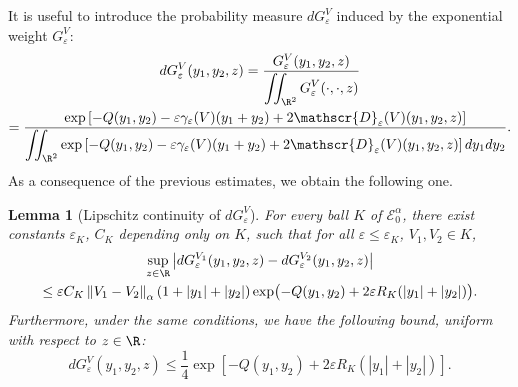 \documentclass[10pt]{amsart}
\let\mathcal\mathscr
\theoremstyle{plain}
\newtheorem{lem}[thm]{Lemma}
\theoremstyle{definition}
\newcommand{\D}{\mathcal{D}_\eps}
\let\eps\varepsilon
\let\ds\displaystyle
\newcommand{\abs}[1]{\left\lvert#1\right\rvert}
\newcommand{\norm}[1]{\left\lVert#1\right\rVert}
\newcommand{\Eaz}{\mathcal{E}^\alpha_0}
\newcommand{\QV}{G_\eps^V}
\newcommand{\dQVA}{dG_\eps^{V_1}}
\newcommand{\dQVB}{dG_\eps^{V_2}}
\begin{document}
It is useful to introduce the probability measure $d\QV$ induced by the exponential weight $\QV$:
\begin{multline*}
d\QV(y_1,y_2,z) = \dfrac{\QV(y_1,y_2,z)}{\ds \iint_{\R^2} \QV(\cdot, \cdot, z)} \\
= \dfrac{\ds \exp\left[-Q(y_1,y_2) -\eps\gamma_\eps(V)(y_1+y_2) + 2 \D(V)(y_1,y_2,z) \right] } {\ds\iint_{\R^2} \exp\left[-Q(y_1,y_2)-\eps\gamma_\eps(V)(y_1+y_2) + 2 \D(V)(y_1,y_2,z) \right] d y_1 d y_2 }.
\end{multline*}
As a consequence of the previous estimates, we obtain the following one.
\begin{lem}[Lipschitz continuity of $d\QV$]\label{contraction measure lem}
For every ball $K$ of $\Eaz$, there exist constants $\eps_K$, $C_K$ depending only on $K$, such that for all $\eps \leq \eps_K $, $V_1, V_2 \in K$,
\begin{multline}\label{eq:cont_measure}
\sup_{z\in \R}\abs{\dQVA(y_1,y_2,z)-\dQVB(y_1,y_2,z)} \\
\leq \eps C_K \norm{V_1-V_2}_\alpha (1+ \abs{y_1} + \abs{y_2}) \exp \bigl(-Q(y_1,y_2) + 2 \eps R_K (\abs{y_1}+\abs{y_2}) \bigr).
\end{multline}
Furthermore, under the same conditions, we have the following bound, uniform with respect to $z \in \R $:
\begin{equation}\label{eq:control dQV}
d\QV(y_1,y_2,z) \leq \dfrac{1}{4}\exp\left[-Q(y_1,y_2) + 2 \eps R_K (\abs{y_1}+\abs{y_2}) \right].
\end{equation}
\end{lem}
\end{document}
